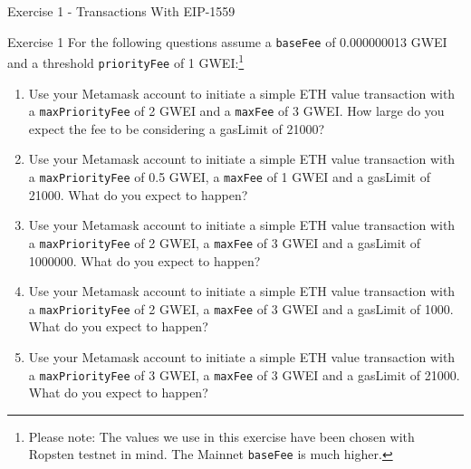 \documentclass[handout]{beamer}
\begin{document}
\begin{frame}{Exercise 1 - Transactions With EIP-1559}
	\begin{exercise}{Exercise 1} 
	For the following questions assume a \texttt{baseFee}  of 0.000000013 GWEI and a threshold \texttt{priorityFee} of 1 GWEI:\footnote{Please note: The values we use in this exercise have been chosen with Ropsten testnet in mind. The Mainnet \texttt{baseFee} is much higher.}
	\begin{enumerate}[a]
		\item Use your Metamask account to initiate a simple ETH value transaction with a \texttt{maxPriorityFee} of 2 GWEI and a \texttt{maxFee} of 3 GWEI. How large do you expect the fee to be considering a gasLimit of 21000?
		\item Use your Metamask account to initiate a simple ETH value transaction with a \texttt{maxPriorityFee} of 0.5 GWEI, a \texttt{maxFee} of 1 GWEI and a gasLimit of 21000. What do you expect to happen?
		\item Use your Metamask account to initiate a simple ETH value transaction with a \texttt{maxPriorityFee} of 2 GWEI, a \texttt{maxFee} of 3 GWEI and a gasLimit of 1000000. What do you expect to happen?
		\item Use your Metamask account to initiate a simple ETH value transaction with a \texttt{maxPriorityFee} of 2 GWEI, a \texttt{maxFee} of 3 GWEI and a gasLimit of 1000. What do you expect to happen?
		\item Use your Metamask account to initiate a simple ETH value transaction with a \texttt{maxPriorityFee} of 3 GWEI, a \texttt{maxFee} of 3 GWEI and a gasLimit of 21000. What do you expect to happen?
	\end{enumerate}
	\end{exercise}
\end{frame}
\end{document}
